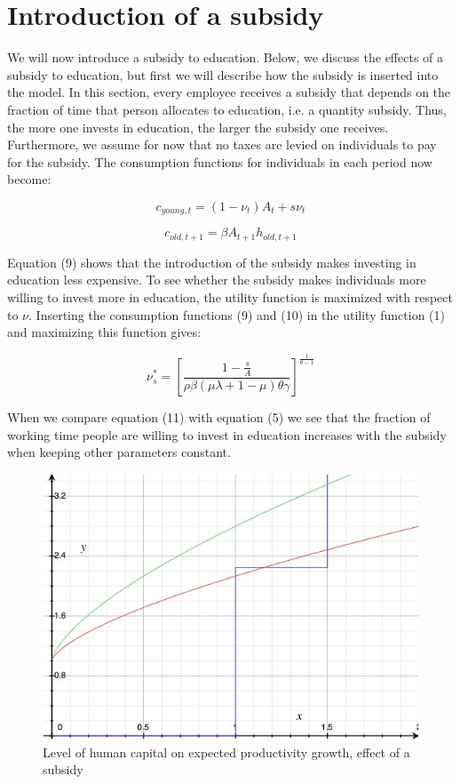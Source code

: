 \documentclass[a4paper,11pt]{article} %
\begin{document}
\section{Introduction of a subsidy}
We will now introduce a subsidy to education. Below, we discuss the effects of a subsidy to education, but first we will describe how the subsidy is inserted into the model. In this section, every employee receives a subsidy that depends on the fraction of time that person allocates to education, i.e. a quantity subsidy. Thus, the more one invests in education, the larger the subsidy one receives. Furthermore, we assume for now that no taxes are levied on individuals to pay for the subsidy. The consumption functions for individuals in each period now become:

\begin{equation}
  c_{young,t}= \left( 1-\nu_t \right)A_t+s\nu_t
\end{equation}

\begin{equation}
  c_{old,t+1}= \beta A_{t+1}h_{old,t+1}
\end{equation}

Equation (9) shows that the introduction of the subsidy makes investing in education less expensive. To see whether the subsidy makes individuals more willing to invest more in education, the utility function is maximized with respect to \(\nu\). Inserting the consumption functions (9) and (10) in the utility function (1) and maximizing this function gives: 

\begin{equation}
  \nu^*_s= \left[ \frac{ 1-\frac{s}{A} }
    {\rho\beta \left( \mu\lambda+1-\mu \right) \theta\gamma} \right]
  ^{\frac{1}{\theta-1}}
\end{equation}

When we compare equation (11) with equation (5) we see that the fraction of working time people are willing to invest in education increases with the subsidy when keeping other parameters constant. 

\begin{figure}
  \centering
  \includegraphics{figure4.png}
  \caption{Level of human capital on expected productivity growth, effect of a subsidy}
\end{figure}
\end{document}

